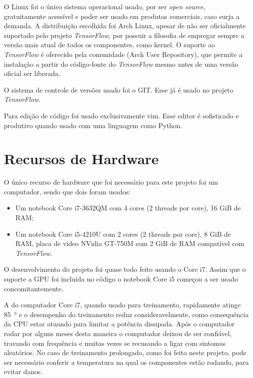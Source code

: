 O Linux foi o único sistema operacional usado, por ser \emph{open source},
gratuitamente acessível e poder ser usado em produtos comerciais, caso surja a
demanda. A distribuição escolhida foi Arch Linux, apesar de não ser
oficialmente suportado pelo projeto \emph{TensorFlow}, por possuir a filosofia
de empregar sempre a versão mais atual de todos os componentes, como kernel. O
suporte ao \emph{TensorFlow} é oferecido pela comunidade
 (Arch User Repository), que permite a instalação a partir do
código-fonte do \emph{TensorFlow} mesmo antes de uma versão oficial ser liberada.

O sistema de controle de versões usado foi o GIT.
Esse 
já é usado no projeto \emph{TensorFlow}.

Para edição de código foi usado exclusivamente vim. Esse editor é sofisticado
e produtivo quando usado com uma linguagem como Python.

\section{Recursos de Hardware} \label{sec:cap5_hw}

O único recurso de hardware que foi necessário para este projeto foi
um computador, sendo que dois foram usados:

\begin{itemize}
\item Um notebook Core i7-3632QM com 4 cores (2 threads por core), 16 GiB
	de RAM;
\item Um notebook Core i5-4210U com 2 cores (2 threads por core), 8 GiB de RAM,
	placa de video NVidia GT-750M com 2 GiB de RAM compatível com
	\emph{TensorFlow}.
\end{itemize}

O desenvolvimento do projeto foi quase todo feito usando o Core i7. Assim que
o suporte a GPU foi incluída no código o notebook Core i5 começou a ser usado
concomitantemente.

A  do computador Core i7, quando usado para treinamento, rapidamente
atinge \SI{85}{\degree} e o desempenho do treinamento reduz consideravelmente,
como consequência da CPU estar atuando para limitar a potência dissipada. Após
o computador rodar por alguns meses desta maneira o computador deixou de ser
confiável, travando com frequência e muitas vezes se recusando a ligar com
sintomas aleatórios. No caso de treinamento prolongado, como foi feito neste
projeto, pode ser necessário conferir a temperatura na qual os componentes
estão rodando, para evitar danos.

